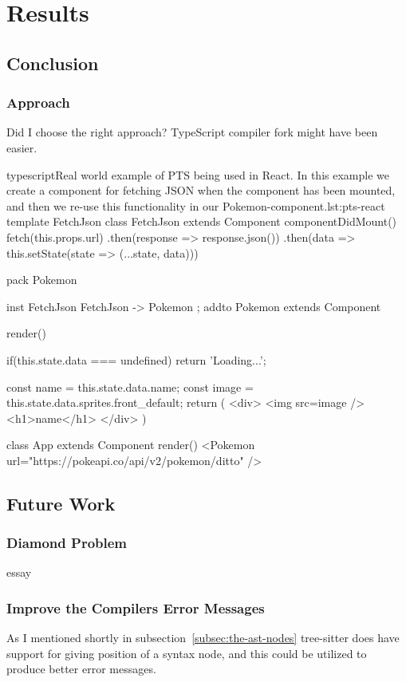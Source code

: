 \chapter{Results}\label{ch:results}

\section{Conclusion}\label{sec:result-conclusion}

\subsection{Approach}\label{subsec:result-approach}

Did I choose the right approach?
TypeScript compiler fork might have been easier.

\begin{code}{typescript}{Real world example of PTS being used in React. In this example we create a component for fetching JSON when the component has been mounted, and then we re-use this functionality in our Pokemon-component.}{lst:pts-react}
template FetchJson {
    class FetchJson extends Component {
        componentDidMount() {
            fetch(this.props.url)
                .then(response => response.json())
                .then(data =>
                    this.setState(state => ({...state, data})))
        }
    }
}

pack Pokemon {
    inst FetchJson { FetchJson -> Pokemon };
    addto Pokemon extends Component {
        render() {
            if(this.state.data === undefined)
                return 'Loading...';

            const name = this.state.data.name;
            const image = this.state.data.sprites.front_default;
            return (
                <div>
                    <img src={image} />
                    <h1>{name}</h1>
                </div>
            )
        }
    }

    class App extends Component {
        render() {
            <Pokemon
                url="https://pokeapi.co/api/v2/pokemon/ditto" />
        }
    }
}
\end{code}

\section{Future Work}\label{sec:future-work}

\subsection{Diamond Problem}\label{subsec:diamond-problem}

essay

\subsection{Improve the Compilers Error Messages}\label{subsec:compiler-with-focus-on-error-messages}

As I mentioned shortly in subsection~\vref{subsec:the-ast-nodes} tree-sitter does have support for giving position of a syntax node, and this could be utilized to produce better error messages.
